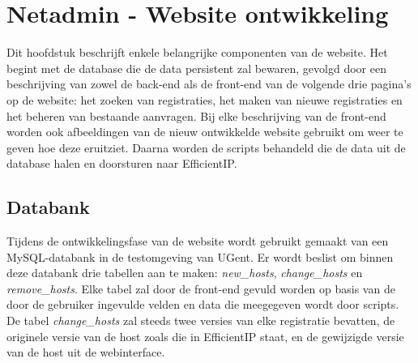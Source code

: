 
\chapter{Netadmin - Website ontwikkeling}%
\label{ch:netadmin-website-ontwikkeling}
Dit hoofdstuk beschrijft enkele belangrijke componenten van de website. Het begint met de database die de data persistent zal bewaren, gevolgd door een beschrijving van zowel de back-end als de front-end van de volgende drie pagina's op de website: het zoeken van registraties, het maken van nieuwe registraties en het beheren van bestaande aanvragen. Bij elke beschrijving van de front-end worden ook afbeeldingen van de nieuw ontwikkelde website gebruikt om weer te geven hoe deze eruitziet. Daarna worden de scripts behandeld die de data uit de database halen en doorsturen naar EfficientIP.

\section{Databank}
\label{databank}
Tijdens de ontwikkelingsfase van de website wordt gebruikt gemaakt van een MySQL-databank in de testomgeving van UGent. Er wordt beslist om binnen deze databank drie tabellen aan te maken: \textit{new\_hosts}, \textit{change\_hosts} en \textit{remove\_hosts}. Elke tabel zal door de front-end gevuld worden op basis van de door de gebruiker ingevulde velden en data die meegegeven wordt door scripts.
De tabel \textit{change\_hosts} zal steeds twee versies van elke registratie bevatten, de originele versie van de host zoals die in EfficientIP staat, en de gewijzigde versie van de host uit de webinterface.

